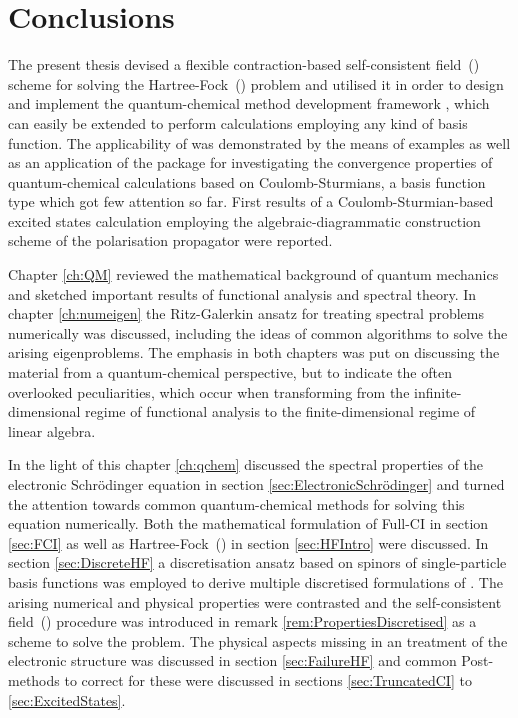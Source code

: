 \chapter{Conclusions}
\label{ch:Conclusion}

\noindent
The present thesis devised a flexible contraction-based self-consistent field~(\SCF)
scheme for solving the Hartree-Fock~(\HF) problem
and utilised it in order to design and implement the
quantum-chemical method development framework \molsturm,
which can easily be extended to perform calculations
employing any kind of basis function.
The applicability of \molsturm was demonstrated by the means
of examples as well as an application of the package for
investigating the convergence properties
of quantum-chemical calculations
based on Coulomb-Sturmians,
a basis function type which got few attention so far.
First results of a Coulomb-Sturmian-based excited states
calculation employing the algebraic-diagrammatic construction scheme
of the polarisation propagator were reported.


Chapter \ref{ch:QM} reviewed the mathematical background of quantum mechanics
and sketched important results of functional analysis
and spectral theory.
In chapter \ref{ch:numeigen} the Ritz-Galerkin ansatz
for treating spectral problems numerically
was discussed, including the ideas of common algorithms
to solve the arising eigenproblems.
The emphasis in both chapters
was put on discussing the material from a quantum-chemical perspective,
but to indicate the often overlooked peculiarities,
which occur when transforming from the infinite-dimensional regime
of functional analysis to the finite-dimensional regime of linear algebra.


In the light of this chapter \ref{ch:qchem}
discussed the spectral properties
of the electronic Schrödinger equation in section \ref{sec:ElectronicSchrödinger} and
turned the attention towards common quantum-chemical methods
for solving this equation numerically.
Both the mathematical formulation of Full-CI in section \ref{sec:FCI}
as well as Hartree-Fock~(\HF) in section \ref{sec:HFIntro} were discussed.
In section \ref{sec:DiscreteHF}
a discretisation ansatz based on spinors of
single-particle basis functions was employed
to derive multiple discretised formulations of \HF.
The arising numerical and physical properties were contrasted
and the self-consistent field~(\SCF) procedure
was introduced in remark \ref{rem:PropertiesDiscretised}
as a scheme to solve the \HF problem.
The physical aspects missing in an \HF treatment of the electronic
structure was discussed in section \ref{sec:FailureHF}
and common Post-\HF methods to correct for these were
discussed in sections \ref{sec:TruncatedCI} to \ref{sec:ExcitedStates}.

